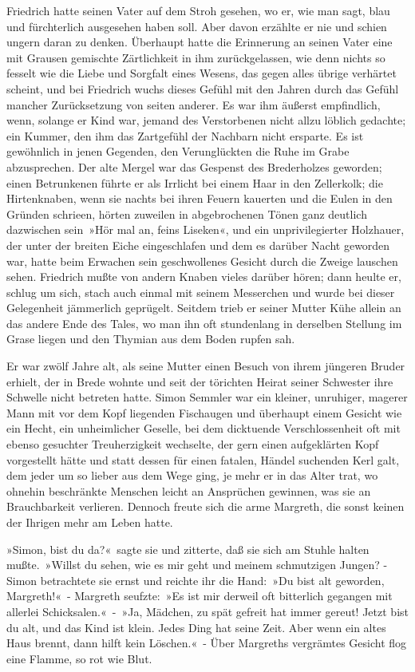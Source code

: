 Friedrich hatte seinen Vater auf dem Stroh gesehen, wo er, wie man sagt, blau und fürchterlich ausgesehen haben soll. Aber davon erzählte er nie und schien ungern daran zu denken. Überhaupt hatte die Erinnerung an seinen Vater eine mit Grausen gemischte Zärtlichkeit in ihm zurückgelassen, wie denn nichts so fesselt wie die Liebe und Sorgfalt eines Wesens, das gegen alles übrige verhärtet scheint, und bei Friedrich wuchs dieses Gefühl mit den Jahren durch das Gefühl mancher Zurücksetzung von seiten anderer. Es war ihm äußerst empfindlich, wenn, solange er Kind war, jemand des Verstorbenen nicht allzu löblich gedachte; ein Kummer, den ihm das Zartgefühl der Nachbarn nicht ersparte. Es ist gewöhnlich in jenen Gegenden, den Verunglückten die Ruhe im Grabe abzusprechen. Der alte Mergel war das Gespenst des Brederholzes geworden; einen Betrunkenen führte er als Irrlicht bei einem Haar in den Zellerkolk; die Hirtenknaben, wenn sie nachts bei ihren Feuern kauerten und die Eulen in den Gründen schrieen, hörten zuweilen in abgebrochenen Tönen ganz deutlich dazwischen sein »Hör mal an, feins Liseken«, und ein unprivilegierter Holzhauer, der unter der breiten Eiche eingeschlafen und dem es darüber Nacht geworden war, hatte beim Erwachen sein geschwollenes Gesicht durch die Zweige lauschen sehen. Friedrich mußte von andern Knaben vieles darüber hören; dann heulte er, schlug um sich, stach auch einmal mit seinem Messerchen und wurde bei dieser Gelegenheit jämmerlich geprügelt. Seitdem trieb er seiner Mutter Kühe allein an das andere Ende des Tales, wo man ihn oft stundenlang in derselben Stellung im Grase liegen und den Thymian aus dem Boden rupfen sah.

Er war zwölf Jahre alt, als seine Mutter einen Besuch von ihrem jüngeren Bruder erhielt, der in Brede wohnte und seit der törichten Heirat seiner Schwester ihre Schwelle nicht betreten hatte. Simon Semmler war ein kleiner, unruhiger, magerer Mann mit vor dem Kopf liegenden Fischaugen und überhaupt einem Gesicht wie ein Hecht, ein unheimlicher Geselle, bei dem dicktuende Verschlossenheit oft mit ebenso gesuchter Treuherzigkeit wechselte, der gern einen aufgeklärten Kopf vorgestellt hätte und statt dessen für einen fatalen, Händel suchenden Kerl galt, dem jeder um so lieber aus dem Wege ging, je mehr er in das Alter trat, wo ohnehin beschränkte Menschen leicht an Ansprüchen gewinnen, was sie an Brauchbarkeit verlieren. Dennoch freute sich die arme Margreth, die sonst keinen der Ihrigen mehr am Leben hatte.

»Simon, bist du da?« sagte sie und zitterte, daß sie sich am Stuhle halten mußte. »Willst du sehen, wie es mir geht und meinem schmutzigen Jungen? - Simon betrachtete sie ernst und reichte ihr die Hand: »Du bist alt geworden, Margreth!« - Margreth seufzte: »Es ist mir derweil oft bitterlich gegangen mit allerlei Schicksalen.« - »Ja, Mädchen, zu spät gefreit hat immer gereut! Jetzt bist du alt, und das Kind ist klein. Jedes Ding hat seine Zeit. Aber wenn ein altes Haus brennt, dann hilft kein Löschen.« - Über Margreths vergrämtes Gesicht flog eine Flamme, so rot wie Blut.

